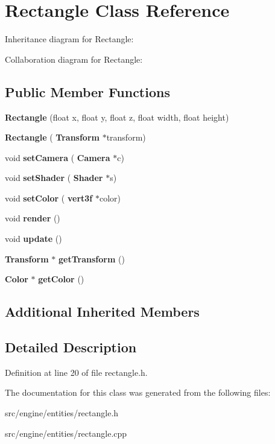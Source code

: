 \section{Rectangle Class Reference}
\label{class_rectangle}


Inheritance diagram for Rectangle\+:


Collaboration diagram for Rectangle\+:
\subsection*{Public Member Functions}
\begin{DoxyCompactItemize}
\item 
\mbox{\label{class_rectangle_a544cc894d3b8e063205dc1feb3c613cb}} 
{\bfseries Rectangle} (float x, float y, float z, float width, float height)
\item 
\mbox{\label{class_rectangle_a67ec673d6518b689e6b2f32394e9647e}} 
{\bfseries Rectangle} (\textbf{ Transform} $\ast$transform)
\item 
\mbox{\label{class_rectangle_a7f8a04b4669020e7aa10251853a8eb7d}} 
void {\bfseries set\+Camera} (\textbf{ Camera} $\ast$c)
\item 
\mbox{\label{class_rectangle_ac19a82d6d3871bb177bc2e57c948672e}} 
void {\bfseries set\+Shader} (\textbf{ Shader} $\ast$s)
\item 
\mbox{\label{class_rectangle_afe05ad2ea791bc9628f126733cee1549}} 
void {\bfseries set\+Color} (\textbf{ vert3f} $\ast$color)
\item 
\mbox{\label{class_rectangle_ad3d1c3e66572c594fa81afae53630ef0}} 
void {\bfseries render} ()
\item 
\mbox{\label{class_rectangle_ab92d1def505d300873233d525638ea19}} 
void {\bfseries update} ()
\item 
\mbox{\label{class_rectangle_aa2c22d45286db9274b5b0b7bc040dd71}} 
\textbf{ Transform} $\ast$ {\bfseries get\+Transform} ()
\item 
\mbox{\label{class_rectangle_ac9086699eadc131b4cea2b7de4245288}} 
\textbf{ Color} $\ast$ {\bfseries get\+Color} ()
\end{DoxyCompactItemize}
\subsection*{Additional Inherited Members}


\subsection{Detailed Description}


Definition at line 20 of file rectangle.\+h.



The documentation for this class was generated from the following files\+:\begin{DoxyCompactItemize}
\item 
src/engine/entities/rectangle.\+h\item 
src/engine/entities/rectangle.\+cpp\end{DoxyCompactItemize}
